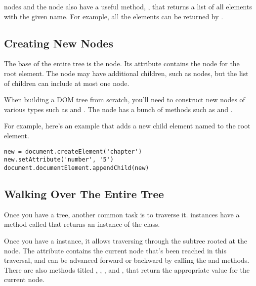 \documentclass{howto}
\begin{document}
 nodes and the  node also have a useful
method, , that returns a
list of all elements with the given name.  For example, all the
 elements can be returned by
.


\subsection{Creating New Nodes}

The base of the entire tree is the  node.  Its
 attribute contains the  node
for the root element.  The  node may have additional
children, such as  nodes, but the list of
children can include at most one  node.

When building a DOM tree from scratch, you'll need to construct new
nodes of various types such as  and .  The
 node has a bunch of  methods such
as  and .

For example, here's an example that adds a new child element named
 to the root element.

\begin{verbatim}
new = document.createElement('chapter')
new.setAttribute('number', '5')
document.documentElement.appendChild(new)
\end{verbatim}


\subsection{Walking Over The Entire Tree}

Once you have a tree, another common task is to traverse it.
 instances have a method called
 that returns an instance of the
 class.

Once you have a  instance, it allows traversing
through the subtree rooted at the  node.  The
 attribute contains the current node that's been
reached in this traversal, and can be advanced forward or backward by
calling the  and  methods.
There are also methods titled ,
, , and
,  that return the
appropriate value for the current node.
\end{document}

